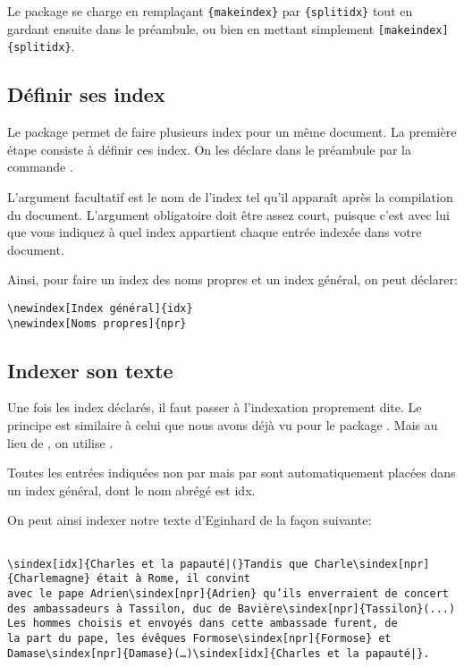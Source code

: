 {Le package se charge en remplaçant \verb|{makeindex}| par \verb|{splitidx}| tout en gardant ensuite  dans le préambule, ou bien en mettant simplement  \verb|[makeindex]{splitidx}|.

\subsection{Définir ses index}

Le package  permet de faire plusieurs index pour un même document. La première étape consiste à définir ces index. On les déclare dans le préambule par la commande .


L'argument facultatif est le nom de l'index tel qu'il apparaît après la compilation du document. L'argument obligatoire doit être assez court, puisque c'est avec lui que vous indiquez à quel index appartient chaque entrée indexée dans votre document.


Ainsi, pour faire un index des noms propres et un index général, on peut déclarer:
\begin{verbatim}
\newindex[Index général]{idx}
\newindex[Noms propres]{npr}
\end{verbatim}

\subsection{Indexer son texte}
Une fois  les index déclarés, il faut passer à l'indexation proprement dite. Le principe est similaire à celui que nous avons déjà vu pour le package .
Mais au lieu de , on utilise . 

\begin{plusloins}

Toutes les entrées indiquées non par  mais par  sont automatiquement placées dans un index général, dont le nom abrégé est idx.

\end{plusloins}
On peut ainsi indexer notre texte d'Eginhard de la façon suivante:

\begin{verbatim}

\sindex[idx]{Charles et la papauté|(}Tandis que Charle\sindex[npr]{Charlemagne} était à Rome, il convint
avec le pape Adrien\sindex[npr]{Adrien} qu’ils enverraient de concert
des ambassadeurs à Tassilon, duc de Bavière\sindex[npr]{Tassilon}(...)
Les hommes choisis et envoyés dans cette ambassade furent, de 
la part du pape, les évêques Formose\sindex[npr]{Formose} et 
Damase\sindex[npr]{Damase}(…)\sindex[idx]{Charles et la papauté|}.


\end{verbatim}}
